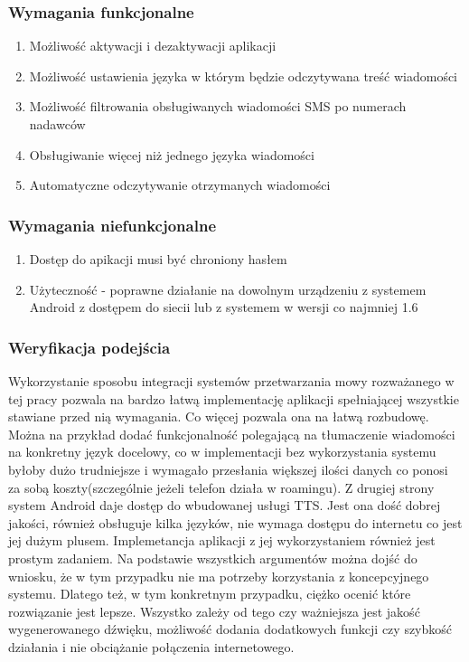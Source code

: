 \subsubsection{Wymagania funkcjonalne}
\begin{enumerate}
	\item Możliwość aktywacji i dezaktywacji aplikacji
	\item Możliwość ustawienia języka w którym będzie odczytywana treść wiadomości
	\item Możliwość filtrowania obsługiwanych wiadomości SMS po numerach nadawców 
	\item Obsługiwanie więcej niż jednego języka wiadomości
	\item Automatyczne odczytywanie otrzymanych wiadomości
\end{enumerate}
\subsubsection{Wymagania niefunkcjonalne}
\begin{enumerate}
	\item Dostęp do apikacji musi być chroniony hasłem
	\item Użyteczność - poprawne działanie na dowolnym urządzeniu z systemem Android z dostępem do siecii lub z systemem w wersji co najmniej 1.6
\end{enumerate}

\subsubsection{Weryfikacja podejścia}
Wykorzystanie sposobu integracji systemów przetwarzania mowy rozważanego w tej pracy pozwala na bardzo łatwą implementację aplikacji spełniającej wszystkie stawiane przed nią wymagania. Co więcej pozwala ona na łatwą rozbudowę. Można na przykład dodać funkcjonalność polegającą na tłumaczenie wiadomości na konkretny język docelowy, co w implementacji bez wykorzystania systemu byłoby dużo trudniejsze i wymagało przesłania większej ilości danych co ponosi za sobą koszty(szczególnie jeżeli telefon działa w roamingu). Z drugiej strony system Android daje dostęp do wbudowanej usługi TTS. Jest ona dość dobrej jakości, również obsługuje kilka języków, nie wymaga dostępu do internetu co jest jej dużym plusem. Implemetancja aplikacji z jej wykorzystaniem również jest prostym zadaniem. Na podstawie wszystkich argumentów można dojść do wniosku, że w tym przypadku nie ma potrzeby korzystania z koncepcyjnego systemu. Dlatego też, w tym konkretnym przypadku, ciężko ocenić które rozwiązanie jest lepsze. Wszystko zależy od tego czy ważniejsza jest jakość wygenerowanego dźwięku, możliwość dodania dodatkowych funkcji czy szybkość działania i nie obciążanie połączenia internetowego.

